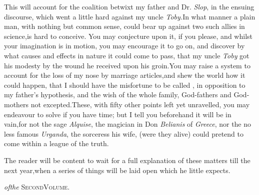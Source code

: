 \documentclass{article}
\begin{document}
This will account for the coalition betwixt my father and Dr.\@
\textit{Slop}, in the ensuing discourse, which went a little
hard against my uncle \textit{Toby.}\tsk In what manner a plain
man, with nothing but common sense, could bear up against two
such allies in science,\tsk is hard to conceive.\tsk\break
You may conjecture upon it, if you please,\break
\tsk and whilst your imagination is in motion, you may encourage
it to go on, and discover by what causes and effects in nature
it could come to pass, that my uncle \textit{Toby} got his
modesty by the wound he received upon his groin.\tsk You may
raise a system to account for the loss of my nose by
marriage articles,\tsk and shew the world how it could happen,
that I should have the misfortune to be called
, in opposition to my father’s
hypothesis, and the wish of the whole family, God-fathers and
God-mothers not excepted.\tsk These, with fifty other points left
yet unravelled, you may endeavour to solve if you have time;\tsh
but I tell you beforehand it will be in vain,\break\tsk for not the sage
\textit{Alquise}, the magician in Don \textit{Belianis} of
\textit{Greece}, nor the no less famous \textit{Urganda}, the
sorceress his wife, (were they alive) could pretend to come
within a league of the truth.

The reader will be content to wait for a full explanation of
these matters till the next year,\tsk when a series of
things will be laid open which he little expects.

\bigskip
\bigskip
\centerline{\textit{\enspace of\enspace the}\enspace
\textsc{Second\enspace Volume}.}
\end{document}
